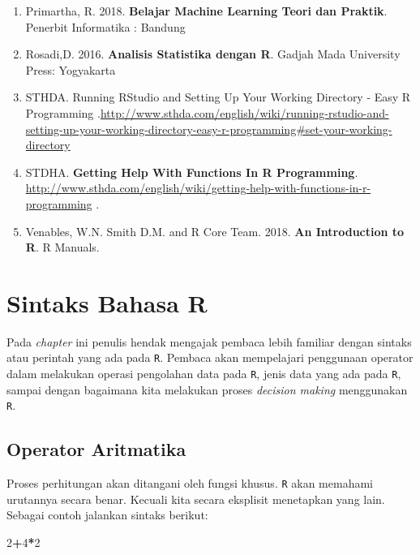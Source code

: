 \documentclass[]{book}
\newenvironment{Shaded}{\begin{snugshade}}{\end{snugshade}}
\newcommand{\DecValTok}[1]{\textcolor[rgb]{0.00,0.00,0.81}{#1}}
\newcommand{\OperatorTok}[1]{\textcolor[rgb]{0.81,0.36,0.00}{\textbf{#1}}}
\providecommand{\tightlist}{%
  \setlength{\itemsep}{0pt}\setlength{\parskip}{0pt}}
\begin{document}
\begin{enumerate}
\def\labelenumi{\arabic{enumi}.}
\tightlist
\item
  Primartha, R. 2018. \textbf{Belajar Machine Learning Teori dan
  Praktik}. Penerbit Informatika : Bandung
\item
  Rosadi,D. 2016. \textbf{Analisis Statistika dengan R}. Gadjah Mada
  University Press: Yogyakarta
\item
  STHDA. Running RStudio and Setting Up Your Working Directory - Easy R
  Programming
  .\url{http://www.sthda.com/english/wiki/running-rstudio-and-setting-up-your-working-directory-easy-r-programming\#set-your-working-directory}
\item
  STDHA. \textbf{Getting Help With Functions In R Programming}.
  \url{http://www.sthda.com/english/wiki/getting-help-with-functions-in-r-programming}
  .
\item
  Venables, W.N. Smith D.M. and R Core Team. 2018. \textbf{An
  Introduction to R}. R Manuals.
\end{enumerate}

\chapter{Sintaks Bahasa R}\label{sintaks-bahasa-r}

Pada \emph{chapter} ini penulis hendak mengajak pembaca lebih familiar
dengan sintaks atau perintah yang ada pada \texttt{R}. Pembaca akan
mempelajari penggunaan operator dalam melakukan operasi pengolahan data
pada \texttt{R}, jenis data yang ada pada \texttt{R}, sampai dengan
bagaimana kita melakukan proses \emph{decision making} menggunakan
\texttt{R}.

\section{Operator Aritmatika}\label{operator-aritmatika}

Proses perhitungan akan ditangani oleh fungsi khusus. \texttt{R} akan
memahami urutannya secara benar. Kecuali kita secara eksplisit
menetapkan yang lain. Sebagai contoh jalankan sintaks berikut:

\begin{Shaded}
\begin{Highlighting}[]
\DecValTok{2}\OperatorTok{+}\DecValTok{4}\OperatorTok{*}\DecValTok{2}
\end{Highlighting}
\end{Shaded}
\end{document}
